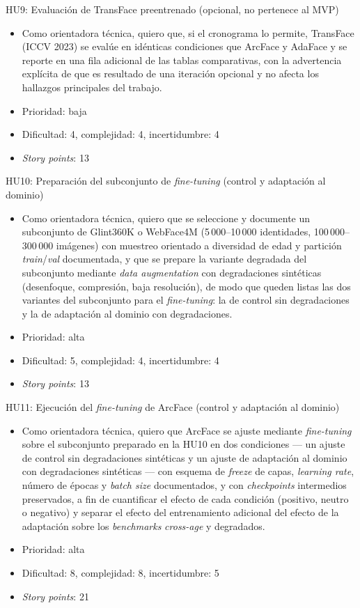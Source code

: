 \documentclass[
  11pt, %
]{charter}
\begin{document}
HU9: Evaluación de TransFace preentrenado (opcional, no pertenece al MVP)
\begin{itemize}
  \item Como orientadora técnica, quiero que, si el cronograma lo permite, TransFace (ICCV 2023) se evalúe en idénticas condiciones que ArcFace y AdaFace y se reporte en una fila adicional de las tablas comparativas, con la advertencia explícita de que es resultado de una iteración opcional y no afecta los hallazgos principales del trabajo.
  \item Prioridad: baja
  \item Dificultad: 4, complejidad: 4, incertidumbre: 4
  \item \textit{Story points}: 13
\end{itemize}

HU10: Preparación del subconjunto de \textit{fine-tuning} (control y adaptación al dominio)
\begin{itemize}
  \item Como orientadora técnica, quiero que se seleccione y documente un subconjunto de Glint360K o WebFace4M (5\,000--10\,000 identidades, 100\,000--300\,000 imágenes) con muestreo orientado a diversidad de edad y partición \textit{train}/\textit{val} documentada, y que se prepare la variante degradada del subconjunto mediante \textit{data augmentation} con degradaciones sintéticas (desenfoque, compresión, baja resolución), de modo que queden listas las dos variantes del subconjunto para el \textit{fine-tuning}: la de control sin degradaciones y la de adaptación al dominio con degradaciones.
  \item Prioridad: alta
  \item Dificultad: 5, complejidad: 4, incertidumbre: 4
  \item \textit{Story points}: 13
\end{itemize}

HU11: Ejecución del \textit{fine-tuning} de ArcFace (control y adaptación al dominio)
\begin{itemize}
  \item Como orientadora técnica, quiero que ArcFace se ajuste mediante \textit{fine-tuning} sobre el subconjunto preparado en la HU10 en dos condiciones --- un ajuste de control sin degradaciones sintéticas y un ajuste de adaptación al dominio con degradaciones sintéticas --- con esquema de \textit{freeze} de capas, \textit{learning rate}, número de épocas y \textit{batch size} documentados, y con \textit{checkpoints} intermedios preservados, a fin de cuantificar el efecto de cada condición (positivo, neutro o negativo) y separar el efecto del entrenamiento adicional del efecto de la adaptación sobre los \textit{benchmarks} \textit{cross-age} y degradados.
  \item Prioridad: alta
  \item Dificultad: 8, complejidad: 8, incertidumbre: 5
  \item \textit{Story points}: 21
\end{itemize}
\end{document}
